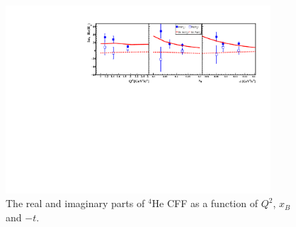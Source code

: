 \documentclass[12pt]{article}
\begin{document}
\begin{figure}[tpb]
   \centering
  \includegraphics[height=7.0cm]{He_CFF_HA.pdf}
  \caption{The real and imaginary parts of $^4$He CFF as a function of $Q^{2}$, 
  $x_B$ and $-t$.}
  \label{fig:}
 \end{figure}                                                                  


%
%
\end{document}
